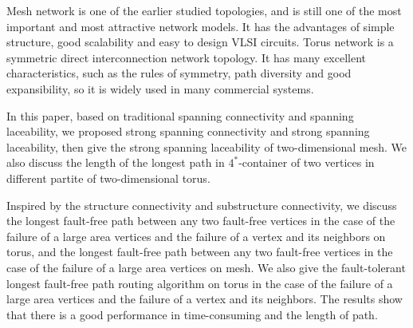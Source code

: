\begin{englishabstract}
Mesh network is one of the earlier studied topologies,
and is still one of the most important and most attractive network models.
It has the advantages of simple structure, good scalability and easy to design VLSI circuits.
Torus network is a symmetric direct interconnection network topology. It has many excellent characteristics,
such as the rules of symmetry, path diversity and good expansibility, so it is widely used in many commercial systems.


In this paper, based on traditional spanning connectivity and spanning laceability,
we proposed strong spanning connectivity and strong spanning laceability, then give the strong spanning laceability of two-dimensional mesh.
We also discuss the length of the longest path in $4^{*}$-container of two vertices in different partite of two-dimensional torus.


Inspired by the structure connectivity and substructure connectivity, we discuss the longest fault-free path between any two fault-free vertices
in the case of the failure of a large area vertices and the failure of a vertex and its neighbors on torus, and the longest fault-free path between any two fault-free vertices in the case of the failure of a large area vertices on mesh.
We also give the fault-tolerant longest fault-free path routing algorithm on torus in the case of the failure of a large area vertices and the failure of a vertex and its neighbors.
The results show that there is a good performance in time-consuming and the length of path.



\end{englishabstract}



